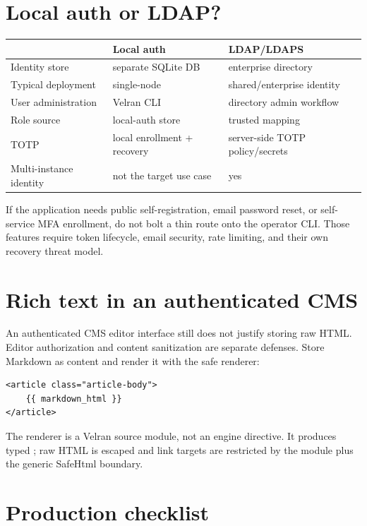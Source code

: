 \section{Local auth or LDAP?}

\begin{center}
\begin{tabularx}{\textwidth}{@{}lYY@{}}
\toprule
 & Local auth & LDAP/LDAPS \\
\midrule
Identity store & separate SQLite DB & enterprise directory \\
Typical deployment & single-node & shared/enterprise identity \\
User administration & Velran CLI & directory admin workflow \\
Role source & local-auth store & trusted mapping \\
TOTP & local enrollment + recovery & server-side TOTP policy/secrets \\
Multi-instance identity & not the target use case & yes \\
\bottomrule
\end{tabularx}
\end{center}

If the application needs public self-registration, email password reset, or self-service MFA enrollment, do not bolt a thin route onto the operator CLI. Those features require token lifecycle, email security, rate limiting, and their own recovery threat model.

\section{Rich text in an authenticated CMS}

An authenticated CMS editor interface still does not justify storing raw HTML. Editor authorization and content sanitization are separate defenses. Store Markdown as content and render it with the safe renderer:

\begin{lstlisting}[language=Velran]
<article class="article-body">
    {{ markdown_html }}
</article>
\end{lstlisting}

The renderer is a Velran source module, not an engine directive. It produces typed ; raw HTML is escaped and link targets are restricted by the module plus the generic SafeHtml boundary.

\section{Production checklist}

